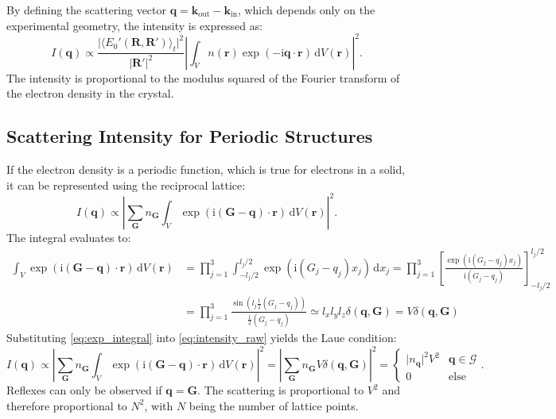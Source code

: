 By defining the scattering vector
$\mathbf{q}=\mathbf{k}_{\mathrm{out}}-\mathbf{k}_{\mathrm{in}}$, which depends only
on the experimental geometry, the intensity is expressed as:
\begin{equation}
	I(\mathbf{q}) \propto \frac{\lvert \langle E_{0}'(\mathbf{R}, \mathbf{R}') \rangle_{t}\rvert^{2}}{\lvert
	\mathbf{R}' \rvert^{2}}\left\lvert \int_{V}n(\mathbf{r}) \exp(-\mathrm{i}\mathbf{q}
	\cdot \mathbf{r}) \, \mathrm{d}V(\mathbf{r}) \right\rvert^{2}.\label{eq:intensity_raw}
\end{equation}
The intensity is proportional to the modulus squared of the Fourier transform of the
electron density in the crystal.

\subsection{Scattering Intensity for Periodic Structures}

If the electron density is a periodic function, which is true for electrons in a solid,
it can be represented using the reciprocal lattice:
\begin{equation}
	I(\mathbf{q}) \propto \left\lvert \sum_{\mathbf{G}}n_{\mathbf{G}}\int_{V}\exp(\mathrm{i}
	(\mathbf{G}-\mathbf{q})\cdot\mathbf{r}) \, \mathrm{d}V(\mathbf{r}) \right\rvert
	^{2}.
\end{equation}
The integral evaluates to:
\begin{equation}
	\begin{aligned}
		\int_{V}\exp(\mathrm{i}(\mathbf{G}-\mathbf{q})\cdot\mathbf{r}) \, \mathrm{d}V(\mathbf{r}) & =\prod_{j=1}^{3}\int_{-l_{j} /2}^{l_{j} /2}\exp(\mathrm{i}(G_{j}-q_{j})x_{j})\, \mathrm{d}x_{j}=\prod_{j=1}^{3}\left[ \frac{\exp(\mathrm{i}(G_{j}-q_{j})x_{j})}{\mathrm{i}(G_{j}-q_{j})}\right]^{l_{j} /2}_{-l_{j}/2} \\
		                                                                                          & =\prod_{j=1}^{3}\frac{\sin\left( l_{j}\frac{1}{2}(G_{j}-q_{j}) \right)}{\frac{1}{2}(G_{j}-q_{j})}\simeq l_{x}l_{y}l_{z}\delta(\mathbf{q}, \mathbf{G})=V\delta(\mathbf{q}, \mathbf{G})
	\end{aligned}
	\label{eq:exp_integral}
\end{equation}
Substituting \cref{eq:exp_integral} into \cref{eq:intensity_raw} yields the Laue
condition:
\begin{equation}
	I(\mathbf{q})\propto\left\lvert \sum_{\mathbf{G}}n_{\mathbf{G}}\int_{V}\exp(\mathrm{i}
	(\mathbf{G}-\mathbf{q})\cdot\mathbf{r}) \, \mathrm{d}V(\mathbf{r}) \right\rvert
	^{2}=\left\lvert \sum_{\mathbf{G}}n_{\mathbf{G}}V \delta(\mathbf{q}, \mathbf{G}
	) \right\rvert^{2}=\left\{
	\begin{matrix}
		\lvert n_{\mathbf{q}}\rvert^{2}V^{2} & \mathbf{q}\in \mathcal{G} \\
		0                                    & \mathrm{else}
	\end{matrix}
	\right..\label{eq:periodic_intensity}
\end{equation}
Reflexes can only be observed if $\mathbf{q}=\mathbf{G}$. The scattering is
proportional to $V^{2}$ and therefore proportional to $N^{2}$, with $N$ being the
number of lattice points.

